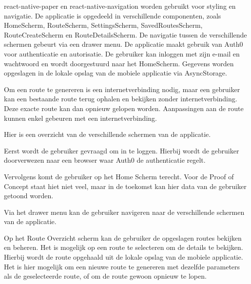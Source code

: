     react-native-paper en react-native-navigation worden gebruikt voor styling en navigatie. 
    De applicatie is opgedeeld in verschillende componenten, 
    zoals HomeScherm, RouteScherm, SettingsScherm, SavedRoutesScherm, RouteCreateScherm en RouteDetailsScherm. 
    De navigatie tussen de verschillende schermen gebeurt via een drawer menu. 
    De applicatie maakt gebruik van Auth0 voor authenticatie en autorisatie. 
    De gebruiker kan inloggen met zijn e-mail en wachtwoord en wordt doorgestuurd naar het HomeScherm. 
    Gegevens worden opgeslagen in de lokale opslag van de mobiele applicatie via AsyncStorage.

    Om een route te genereren is een internetverbinding nodig, 
    maar een gebruiker kan een bestaande route terug ophalen en bekijken zonder internetverbinding. Deze exacte route kan dan opnieuw gelopen worden. Aanpassingen aan de route kunnen enkel gebeuren met een internetverbinding.
    
    Hier is een overzicht van de verschillende schermen van de applicatie.
    
    Eerst wordt de gebruiker gevraagd om in te loggen. Hierbij wordt de gebruiker doorverwezen naar een browser waar Auth0 de authenticatie regelt.


    Vervolgens komt de gebruiker op het Home Scherm terecht. Voor de Proof of Concept staat hiet niet veel, 
    maar in de toekomst kan hier data van de gebruiker getoond worden.


    Via het drawer menu kan de gebruiker navigeren naar de verschillende schermen van de applicatie.


    Op het Route Overzicht scherm kan de gebruiker de opgeslagen routes bekijken en beheren. Het is mogelijk op een route te selecteren om de details te bekijken. Hierbij wordt de route opgehaald uit de lokale opslag van de mobiele applicatie. Het is hier mogelijk om een nieuwe route te genereren met dezelfde parameters als de geselecteerde route, of om de route gewoon opnieuw te lopen.

